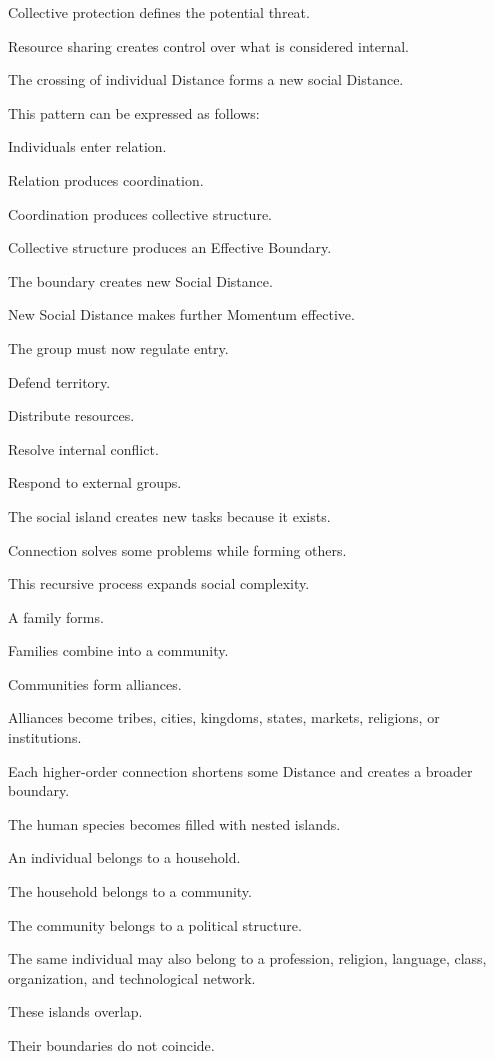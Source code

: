 Collective protection defines the potential threat.

Resource sharing creates control over what is considered internal.

The crossing of individual Distance forms a new social Distance.

This pattern can be expressed as follows:

Individuals enter relation.

Relation produces coordination.

Coordination produces collective structure.

Collective structure produces an Effective Boundary.

The boundary creates new Social Distance.

New Social Distance makes further Momentum effective.

The group must now regulate entry.

Defend territory.

Distribute resources.

Resolve internal conflict.

Respond to external groups.

The social island creates new tasks because it exists.

Connection solves some problems while forming others.

This recursive process expands social complexity.

A family forms.

Families combine into a community.

Communities form alliances.

Alliances become tribes, cities, kingdoms, states, markets, religions, or institutions.

Each higher-order connection shortens some Distance and creates a broader boundary.

The human species becomes filled with nested islands.

An individual belongs to a household.

The household belongs to a community.

The community belongs to a political structure.

The same individual may also belong to a profession, religion, language, class, organization, and technological network.

These islands overlap.

Their boundaries do not coincide.

